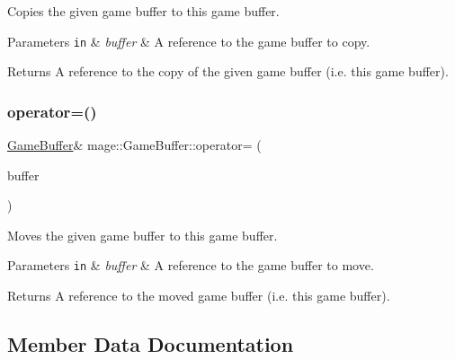 Copies the given game buffer to this game buffer.


\begin{DoxyParams}[1]{Parameters}
\mbox{\tt in}  & {\em buffer} & A reference to the game buffer to copy. \\
\hline
\end{DoxyParams}
\begin{DoxyReturn}{Returns}
A reference to the copy of the given game buffer (i.\+e. this game buffer). 
\end{DoxyReturn}
\hypertarget{structmage_1_1_game_buffer_af699a10b932a9f766acb990edefa03a5}{}\label{structmage_1_1_game_buffer_af699a10b932a9f766acb990edefa03a5} 
\subsubsection{\texorpdfstring{operator=()}{operator=()}\hspace{0.1cm}{\footnotesize\ttfamily [2/2]}}
{\footnotesize\ttfamily \hyperlink{structmage_1_1_game_buffer}{Game\+Buffer}\& mage\+::\+Game\+Buffer\+::operator= (\begin{DoxyParamCaption}\item[{\hyperlink{structmage_1_1_game_buffer}{Game\+Buffer} \&\&}]{buffer }\end{DoxyParamCaption})\hspace{0.3cm}{\ttfamily [default]}}

Moves the given game buffer to this game buffer.


\begin{DoxyParams}[1]{Parameters}
\mbox{\tt in}  & {\em buffer} & A reference to the game buffer to move. \\
\hline
\end{DoxyParams}
\begin{DoxyReturn}{Returns}
A reference to the moved game buffer (i.\+e. this game buffer). 
\end{DoxyReturn}


\subsection{Member Data Documentation}
\hypertarget{structmage_1_1_game_buffer_a7c7abe0dbee37447b27c9e7f7c95d479}{}\label{structmage_1_1_game_buffer_a7c7abe0dbee37447b27c9e7f7c95d479} 
